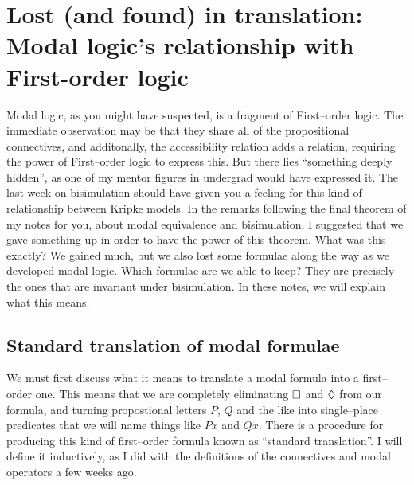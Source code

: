 \chapter[Modal logic's relationship with First-order logic]{Lost (and found) in translation: Modal logic's relationship with First-order logic}

Modal logic, as you might have suspected, is a fragment of First--order logic. The immediate observation may be that they share
all of the propositional connectives, and additonally, the accessibility relation adds a relation, requiring the power of 
First--order logic to express this. But there lies ``something deeply hidden'', as one of my mentor figures in undergrad would
have expressed it. The last week on bisimulation should have given you a feeling for this kind of relationship between
Kripke models. In the remarks following the final theorem of my notes for you, about modal equivalence and bisimulation, I
suggested that we gave something up in order to have the power of this theorem. What was this exactly? We gained much,
but we also lost some formulae along the way as we developed modal logic. Which formulae are we able to keep? They are
precisely the ones that are invariant under bisimulation. In these notes, we will explain what this means.

\setcounter{section}{-1}

\section{Standard translation of modal formulae}
We must first discuss what it means to translate a modal formula into a first--order one. This means that we are completely
eliminating $\square$ and $\lozenge$ from our formula, and turning propostional letters $P$, $Q$ and the like into
single--place predicates that we will name things like $Px$ and $Qx$. There is a procedure for producing this kind of first--order
formula known as ``standard translation''. I will define it inductively, as I did with the definitions of the connectives and
modal operators a few weeks ago.

